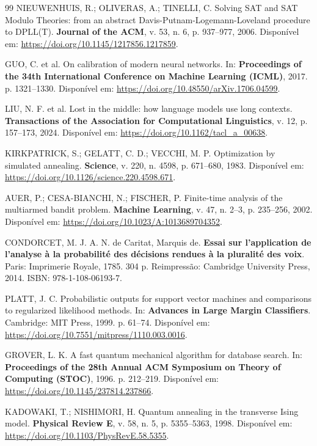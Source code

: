 \documentclass[5p]{elsarticle}
\theoremstyle{remark}
\begin{document}
\begin{thebibliography}{99}
NIEUWENHUIS, R.; OLIVERAS, A.; TINELLI, C. Solving SAT and SAT Modulo Theories: from an abstract Davis-Putnam-Logemann-Loveland procedure to DPLL(T). \textbf{Journal of the ACM}, v. 53, n. 6, p. 937--977, 2006. Disponível em: \url{https://doi.org/10.1145/1217856.1217859}.

GUO, C. et al. On calibration of modern neural networks. In: \textbf{Proceedings of the 34th International Conference on Machine Learning (ICML)}, 2017. p. 1321--1330. Disponível em: \url{https://doi.org/10.48550/arXiv.1706.04599}.

LIU, N. F. et al. Lost in the middle: how language models use long contexts. \textbf{Transactions of the Association for Computational Linguistics}, v. 12, p. 157--173, 2024. Disponível em: \url{https://doi.org/10.1162/tacl_a_00638}.

KIRKPATRICK, S.; GELATT, C. D.; VECCHI, M. P. Optimization by simulated annealing. \textbf{Science}, v. 220, n. 4598, p. 671--680, 1983. Disponível em: \url{https://doi.org/10.1126/science.220.4598.671}.

AUER, P.; CESA-BIANCHI, N.; FISCHER, P. Finite-time analysis of the multiarmed bandit problem. \textbf{Machine Learning}, v. 47, n. 2--3, p. 235--256, 2002. Disponível em: \url{https://doi.org/10.1023/A:1013689704352}.

CONDORCET, M. J. A. N. de Caritat, Marquis de. \textbf{Essai sur l'application de l'analyse à la probabilité des décisions rendues à la pluralité des voix}. Paris: Imprimerie Royale, 1785. 304 p. Reimpressão: Cambridge University Press, 2014. ISBN: 978-1-108-06193-7.

PLATT, J. C. Probabilistic outputs for support vector machines and comparisons to regularized likelihood methods. In: \textbf{Advances in Large Margin Classifiers}. Cambridge: MIT Press, 1999. p. 61--74. Disponível em: \url{https://doi.org/10.7551/mitpress/1110.003.0016}.

GROVER, L. K. A fast quantum mechanical algorithm for database search. In: \textbf{Proceedings of the 28th Annual ACM Symposium on Theory of Computing (STOC)}, 1996. p. 212--219. Disponível em: \url{https://doi.org/10.1145/237814.237866}.

KADOWAKI, T.; NISHIMORI, H. Quantum annealing in the transverse Ising model. \textbf{Physical Review E}, v. 58, n. 5, p. 5355--5363, 1998. Disponível em: \url{https://doi.org/10.1103/PhysRevE.58.5355}.


\end{thebibliography}
\end{document}
